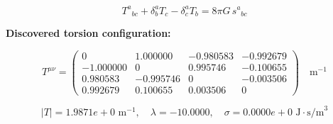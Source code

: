 
\begin{equation}
  T^a{}_{bc} + \delta^a_b T_c - \delta^a_c T_b = 8\pi G \, s^a{}_{bc}
\end{equation}

\textbf{Discovered torsion configuration:}

\begin{equation}
  T^{\mu\nu} = \begin{pmatrix}
    0 & 1.000000 & -0.980583 & -0.992679 \\
    -1.000000 & 0 & 0.995746 & -0.100655 \\
    0.980583 & -0.995746 & 0 & -0.003506 \\
    0.992679 & 0.100655 & 0.003506 & 0
  \end{pmatrix} \quad \text{m}^{-1}
\end{equation}

\begin{equation}
  |T| = 1.9871e+0 \text{ m}^{-1}, \quad
  \lambda = -10.0000, \quad
  \sigma = 0.0000e+0 \text{ J}\cdot\text{s/m}^3
\end{equation}